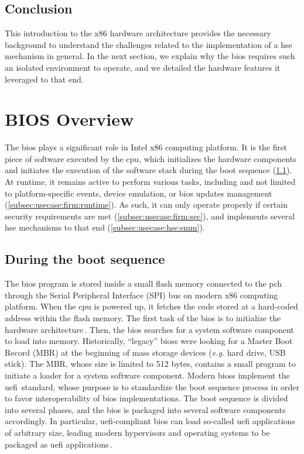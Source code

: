 \subsection*{Conclusion}

This introduction to the x86 hardware architecture provides the necessary
background to understand the challenges related to the implementation of a
\ac{hse} mechanism in general.
%
In the next section, we explain why the \ac{bios} requires such an isolated
environment to operate, and we detailed the hardware features it leveraged to
that end.

\section{BIOS Overview}
\label{sec:usecase:firmware}

The \ac{bios} plays a significant role in Intel x86 computing platform.
%
It is the first piece of software executed by the \ac{cpu}, which initializes
the hardware components and initiates the execution of the software stack during
the boot sequence (\ref{subsec:usecase:firm:boot}).
%
At runtime, it remains active to perform various tasks, including and not
limited to platform-specific events, device emulation, or \ac{bios} updates
management (\ref{subsec:usecase:firm:runtime}).
%
As such, it can only operate properly if certain security requirements are met
(\ref{subsec:usecase:firm:sec}), and implements several \ac{hse} mechanisms to
that end (\ref{subsec:usecase:hse:smm}).

\subsection{During the boot sequence}
\label{subsec:usecase:firm:boot}

The \ac{bios} program is stored inside a small flash memory connected to the
\ac{pch} through the Serial Peripheral Interface (SPI) bus on modern x86
computing platform.
%
When the \ac{cpu} is powered up, it fetches the code stored at a hard-coded
address within the flash memory.
%
The first task of the \ac{bios} is to initialize the hardware
architecture\,\cite{salihun2006bios}.
%
Then, the \ac{bios} searches for a system software component to load into
memory.
%
Historically, ``legacy'' \acp{bios} were looking for a Master Boot Record (MBR)
at the beginning of mass storage devices (\emph{e.g.} hard drive, USB stick).
%
The MBR, whose size is limited to 512 bytes, contains a small program to
initiate a loader for a system software component.
%
Modern \acp{bios} implement the \ac{uefi}\,\cite{zimmer2007uefi,uefi2017specs}
standard, whose purpose is to standardize the boot sequence process in order to
favor interoperability of \ac{bios} implementations.
%
The boot sequence is divided into several phases, and the \ac{bios} is packaged
into several software components accordingly.
%
In particular, \ac{uefi}-compliant \ac{bios} can load so-called \ac{uefi}
applications of arbitrary size, leading modern hypervisors and operating systems
to be packaged as \ac{uefi} applications\,\cite{2011efistub}.

